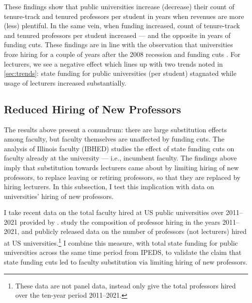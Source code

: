 These findings show that public universities increase (decrease) their count of tenure-track and tenured professors per student in years when revenues are more (less) plentiful.
In the same vein, when funding increased, count of tenure-track and tenured professors per student increased --- and the opposite in years of funding cuts.
These findings are in line with the observation that universities froze hiring for a couple of years after the 2008 recession and funding cuts \citep{turner2014impact}.
For lecturers, we see a negative effect which lines up with two trends noted in \autoref{sec:trends}: state funding for public universities (per student) stagnated while usage of lecturers increased substantially.


\subsection{Reduced Hiring of New Professors}
The results above present a conundrum: there are large substitution effects among faculty, but faculty themselves are unaffected by funding cuts.
The analysis of Illinois faculty (IBHED) studies the effect of state funding cuts on faculty already at the university --- i.e., incumbent faculty.
The findings above imply that substitution towards lecturers came about by limiting hiring of new professors, to replace leaving or retiring professors, so that they are replaced by hiring lecturers.
In this subsection, I test this implication with data on universities' hiring of new professors.

I take recent data on the total faculty hired at US public universities over 2011--2021 provided by \cite{wapman2022quantifying,wapman2022zenodo}.
\cite{wapman2022quantifying} study the composition of professor hiring in the years 2011--2021, and publicly released data on the number of professors (not lecturers) hired at US universities.\footnote{
    These data are not panel data, instead only give the total professors hired over the ten-year period 2011--2021.
}
I combine this measure, with total state funding for public universities across the same time period from IPEDS, to validate the claim that state funding cuts led to faculty substitution via limiting hiring of new professors.

